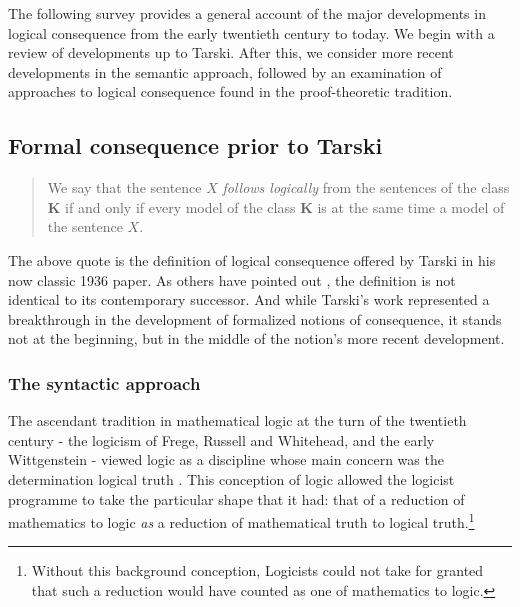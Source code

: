 \documentclass[]{article}
\begin{document}
The following survey provides a general account of the major developments in logical consequence from the early twentieth century to today. We begin with a review of developments up to Tarski. After this, we consider more recent developments in the semantic approach, followed by an examination of approaches to logical consequence found in the proof-theoretic tradition.
\subsection{Formal consequence prior to Tarski}
\begin{quote}
{We say that the sentence $X$ \textit{follows logically} from the sentences of the class $\textbf{K}$ if and only if every model of the class $\textbf{K}$ is at the same time a model of the sentence $X$.} \cite[186]{Tarski2002}
\end{quote}

The above quote is the definition of logical consequence offered by Tarski in his now classic 1936 paper. As others have pointed out \cite{Hodges1986} \cite{Etchemendy1988} \cite{Etchemendy2008} \cite{Sher1991}, the definition is not identical to its contemporary successor. And while Tarski's work represented a breakthrough in the development of formalized notions of consequence, it stands not at the beginning, but in the middle of the notion's more recent development.
\subsubsection{The syntactic approach}
The ascendant tradition in mathematical logic at the turn of the twentieth century - the logicism of Frege, Russell and Whitehead, and the early Wittgenstein - viewed logic as a discipline whose main concern was the determination logical truth \cite[74-77]{Etchemendy1988}. This conception of logic allowed the logicist programme to take the particular shape that it had: that of a reduction of mathematics to logic \textit{as} a reduction of mathematical truth to logical truth.\footnote{Without this background conception, Logicists could not take for granted that such a reduction would have counted as one of mathematics to logic.}
\end{document}
